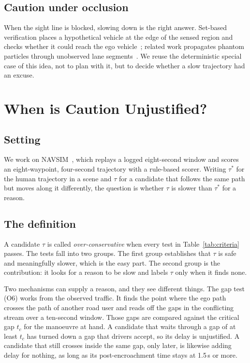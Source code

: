 \documentclass[conference]{IEEEtran}
\begin{document}
\subsection{Caution under occlusion}
When the sight line is blocked, slowing down is the right answer. Set-based
verification places a hypothetical vehicle at the edge of the sensed region and
checks whether it could reach the ego vehicle~\cite{orzechowski2018}; related
work propagates phantom particles through unobserved lane
segments~\cite{yu2019,park2023}. We reuse the deterministic special case of this
idea, not to plan with it, but to decide whether a slow trajectory had an
excuse.

\section{When is Caution Unjustified?}
\label{sec:definition}

\subsection{Setting}
We work on NAVSIM~\cite{navsim}, which replays a logged eight-second window and
scores an eight-waypoint, four-second trajectory with a rule-based
scorer. Writing $\tau^{*}$ for the human trajectory in a scene and $\tau$ for a
candidate that follows the same path but moves along it differently, the
question is whether $\tau$ is slower than $\tau^{*}$ for a reason.

\subsection{The definition}
A candidate $\tau$ is called \emph{over-conservative} when every test in
Table~\ref{tab:criteria} passes. The tests fall into two groups. The first group
establishes that $\tau$ is safe and meaningfully slower, which is the easy
part. The second group is the contribution: it looks for a reason to be slow and
labels $\tau$ only when it finds none.

Two mechanisms can supply a reason, and they see different things. The gap test
(O6) works from the observed traffic. It finds the point where the ego path
crosses the path of another road user and reads off the gaps in the conflicting
stream over a ten-second window. Those gaps are compared against the critical
gap $t_c$ for the manoeuvre at hand. A candidate that waits through a gap of at
least $t_c$ has turned down a gap that drivers accept, so its delay is
unjustified. A candidate that still crosses inside the same gap, only later, is
likewise adding delay for nothing, as long as its post-encroachment time stays
at 1.5\,s or more.
\end{document}
